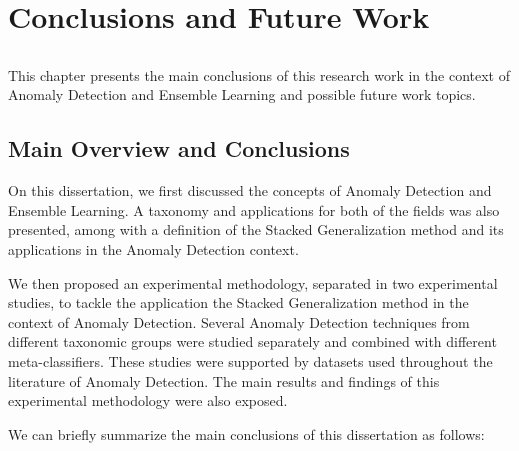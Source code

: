 \chapter{Conclusions and Future Work} \label{chap:conc}

\section*{}

This chapter presents the main conclusions of this research work in the context of Anomaly Detection and Ensemble Learning and possible future work topics.

\section{Main Overview and Conclusions}

On this dissertation, we first discussed the concepts of Anomaly Detection and Ensemble Learning. A taxonomy and applications for both of the fields was also presented, among with a definition of the Stacked Generalization method and its applications in the Anomaly Detection context.

We then proposed an experimental methodology, separated in two experimental studies, to tackle the application the Stacked Generalization method in the context of Anomaly Detection.
Several Anomaly Detection techniques from different taxonomic groups were studied separately and combined with different meta-classifiers.
These studies were supported by datasets used throughout the literature of Anomaly Detection.
The main results and findings of this experimental methodology were also exposed.

We can briefly summarize the main conclusions of this dissertation as follows:

